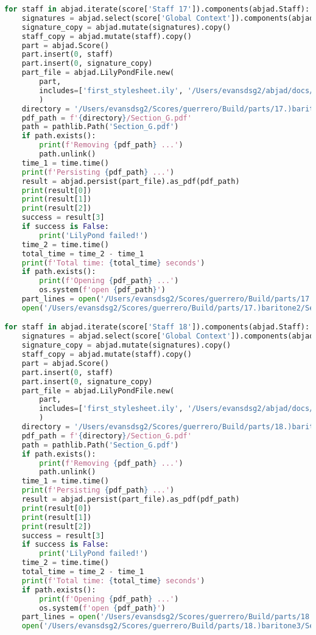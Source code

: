 \begin{lstlisting}[language=Python, caption=Invocation Source Code]
for staff in abjad.iterate(score['Staff 17']).components(abjad.Staff):
    signatures = abjad.select(score['Global Context']).components(abjad.Staff)
    signature_copy = abjad.mutate(signatures).copy()
    staff_copy = abjad.mutate(staff).copy()
    part = abjad.Score()
    part.insert(0, staff)
    part.insert(0, signature_copy)
    part_file = abjad.LilyPondFile.new(
        part,
        includes=['first_stylesheet.ily', '/Users/evansdsg2/abjad/docs/source/_stylesheets/abjad.ily'],
        )
    directory = '/Users/evansdsg2/Scores/guerrero/Build/parts/17.)baritone2'
    pdf_path = f'{directory}/Section_G.pdf'
    path = pathlib.Path('Section_G.pdf')
    if path.exists():
        print(f'Removing {pdf_path} ...')
        path.unlink()
    time_1 = time.time()
    print(f'Persisting {pdf_path} ...')
    result = abjad.persist(part_file).as_pdf(pdf_path)
    print(result[0])
    print(result[1])
    print(result[2])
    success = result[3]
    if success is False:
        print('LilyPond failed!')
    time_2 = time.time()
    total_time = time_2 - time_1
    print(f'Total time: {total_time} seconds')
    if path.exists():
        print(f'Opening {pdf_path} ...')
        os.system(f'open {pdf_path}')
    part_lines = open('/Users/evansdsg2/Scores/guerrero/Build/parts/17.)baritone2/Section_G.ly').readlines()
    open('/Users/evansdsg2/Scores/guerrero/Build/parts/17.)baritone2/Section_G.ly', 'w').writelines(part_lines[15:-1])

for staff in abjad.iterate(score['Staff 18']).components(abjad.Staff):
    signatures = abjad.select(score['Global Context']).components(abjad.Staff)
    signature_copy = abjad.mutate(signatures).copy()
    staff_copy = abjad.mutate(staff).copy()
    part = abjad.Score()
    part.insert(0, staff)
    part.insert(0, signature_copy)
    part_file = abjad.LilyPondFile.new(
        part,
        includes=['first_stylesheet.ily', '/Users/evansdsg2/abjad/docs/source/_stylesheets/abjad.ily'],
        )
    directory = '/Users/evansdsg2/Scores/guerrero/Build/parts/18.)baritone3'
    pdf_path = f'{directory}/Section_G.pdf'
    path = pathlib.Path('Section_G.pdf')
    if path.exists():
        print(f'Removing {pdf_path} ...')
        path.unlink()
    time_1 = time.time()
    print(f'Persisting {pdf_path} ...')
    result = abjad.persist(part_file).as_pdf(pdf_path)
    print(result[0])
    print(result[1])
    print(result[2])
    success = result[3]
    if success is False:
        print('LilyPond failed!')
    time_2 = time.time()
    total_time = time_2 - time_1
    print(f'Total time: {total_time} seconds')
    if path.exists():
        print(f'Opening {pdf_path} ...')
        os.system(f'open {pdf_path}')
    part_lines = open('/Users/evansdsg2/Scores/guerrero/Build/parts/18.)baritone3/Section_G.ly').readlines()
    open('/Users/evansdsg2/Scores/guerrero/Build/parts/18.)baritone3/Section_G.ly', 'w').writelines(part_lines[15:-1])


\end{lstlisting}
